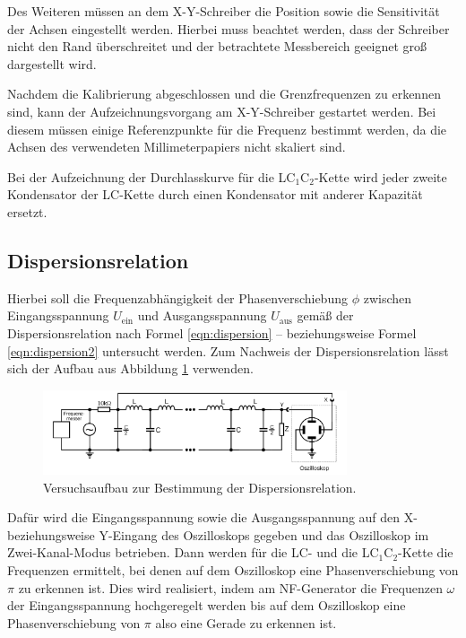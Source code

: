 Des Weiteren müssen an dem X-Y-Schreiber die Position sowie die Sensitivität der Achsen eingestellt werden.
Hierbei muss beachtet werden, dass der Schreiber nicht den Rand überschreitet und der betrachtete Messbereich geeignet groß dargestellt wird.

Nachdem die Kalibrierung abgeschlossen und die Grenzfrequenzen zu erkennen sind, kann der Aufzeichnungsvorgang am X-Y-Schreiber gestartet werden.
Bei diesem müssen einige Referenzpunkte für die Frequenz bestimmt werden,
da die Achsen des verwendeten Millimeterpapiers nicht skaliert sind.

Bei der Aufzeichnung der Durchlasskurve für die LC$_1$C$_2$-Kette wird jeder zweite Kondensator der LC-Kette durch einen Kondensator mit anderer Kapazität ersetzt.


\subsection{Dispersionsrelation}
\label{sec:dispi}

Hierbei soll die Frequenzabhängigkeit der Phasenverschiebung $\phi$
zwischen Eingangsspannung $U_{\text{ein}}$ und Ausgangsspannung $U_{\text{aus}}$ gemäß der Dispersionsrelation nach Formel \eqref{eqn:dispersion}
-- beziehungsweise Formel \eqref{eqn:dispersion2} untersucht werden.
Zum Nachweis der Dispersionsrelation lässt sich der Aufbau aus Abbildung
\ref{fig:dispersionsrealtion} verwenden.
\begin{figure}
    \centering
    \includegraphics[width=0.8\textwidth]{Bilder/dispersionsrelation.png}
    \caption{Versuchsaufbau zur Bestimmung der Dispersionsrelation. \cite{Anleitung}}
    \label{fig:dispersionsrealtion}
\end{figure}
Dafür wird die Eingangsspannung sowie die Ausgangsspannung auf den X- beziehungsweise Y-Eingang
des Oszilloskops gegeben und das Oszilloskop im Zwei-Kanal-Modus betrieben.
Dann werden für die LC- und die LC$_1$C$_2$-Kette die Frequenzen ermittelt, bei denen auf
dem Oszilloskop eine Phasenverschiebung von $\pi$ zu erkennen ist.
Dies wird realisiert, indem am NF-Generator die Frequenzen $\omega$ der Eingangsspannung
hochgeregelt werden bis auf dem Oszilloskop eine Phasenverschiebung von $\pi$ also eine
Gerade zu erkennen ist.


